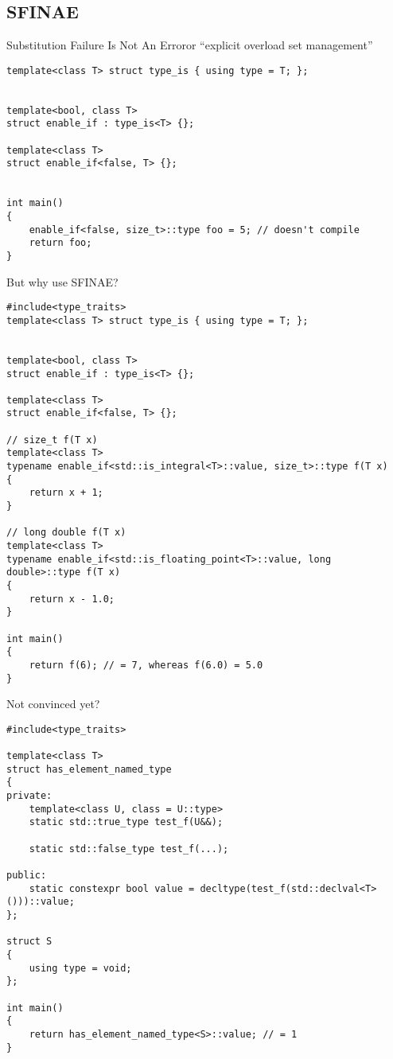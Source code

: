 \documentclass{beamer}
\begin{document}
\subsection{SFINAE}
\begin{frame}[fragile]{Substitution Failure Is Not An Error}{or ``explicit overload set management''}
\begin{lstlisting}
template<class T> struct type_is { using type = T; };


template<bool, class T>
struct enable_if : type_is<T> {};

template<class T>
struct enable_if<false, T> {};


int main()
{
	enable_if<false, size_t>::type foo = 5; // doesn't compile
	return foo;
}
\end{lstlisting}
\end{frame}

\begin{frame}[fragile]{But why use SFINAE?}
\begin{lstlisting}
#include<type_traits>
template<class T> struct type_is { using type = T; };


template<bool, class T>
struct enable_if : type_is<T> {};

template<class T>
struct enable_if<false, T> {};

// size_t f(T x)
template<class T>
typename enable_if<std::is_integral<T>::value, size_t>::type f(T x)
{
	return x + 1;
}

// long double f(T x)
template<class T>
typename enable_if<std::is_floating_point<T>::value, long double>::type f(T x)
{
	return x - 1.0;
}

int main()
{
	return f(6); // = 7, whereas f(6.0) = 5.0
}
\end{lstlisting}
\end{frame}

\begin{frame}[fragile]{Not convinced yet?}
\begin{lstlisting}
#include<type_traits>

template<class T>
struct has_element_named_type
{
private:
	template<class U, class = U::type>
	static std::true_type test_f(U&&);
	
	static std::false_type test_f(...);
	
public:
	static constexpr bool value = decltype(test_f(std::declval<T>()))::value;
};

struct S
{
	using type = void;
};

int main()
{
	return has_element_named_type<S>::value; // = 1
}
\end{lstlisting}
\end{frame}
\end{document}
